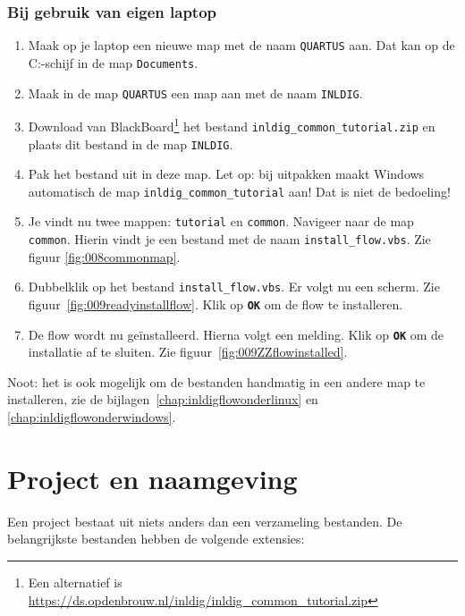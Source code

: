 \documentclass[a4paper,12pt,fleqn,twoside]{book}
\newcommand{\knop}[1]{\texttt{\textbf{#1}}}
\begin{document}
\subsubsection*{Bij gebruik van eigen laptop}
\begin{enumerate}\itemsep-1pt
\item Maak op je laptop een nieuwe map met de naam \lstinline{QUARTUS} aan. Dat kan op de C:-schijf in de map \lstinline|Documents|.
\item Maak in de map \lstinline|QUARTUS| een map aan met de naam \lstinline|INLDIG|.
\item Download van BlackBoard\footnote{Een alternatief is
      \url{https://ds.opdenbrouw.nl/inldig/inldig_common_tutorial.zip}} het
      bestand \lstinline|inldig_common_tutorial.zip| en plaats dit bestand in
      de map \lstinline|INLDIG|. 
\item Pak het bestand uit in deze map. Let op: bij uitpakken maakt Windows
      automatisch de map \lstinline|inldig_common_tutorial| aan! Dat is niet
      de bedoeling!
\item Je vindt nu twee mappen: \lstinline|tutorial| en \lstinline|common|.
      Navigeer naar de map \lstinline|common|. Hierin vindt je een bestand met
      de naam \lstinline|install_flow.vbs|. Zie figuur \ref{fig:008commonmap}.
\item Dubbelklik op het bestand \lstinline|install_flow.vbs|. Er volgt nu een scherm.
	  Zie figuur~\ref{fig:009readyinstallflow}. Klik op \knop{OK} om de flow te installeren.
\item De flow wordt nu ge\"installeerd. Hierna volgt een melding. Klik op \knop{OK} om de installatie af te sluiten.
Zie figuur~\ref{fig:009ZZflowinstalled}.
\end{enumerate}
 
Noot: het is ook mogelijk om de bestanden handmatig in een andere map te
installeren, zie de bijlagen~\ref{chap:inldigflowonderlinux} en
\ref{chap:inldigflowonderwindows}. 


\section{Project en naamgeving}
\label{sec:projectennaamgeving}
Een project bestaat uit niets anders dan een verzameling bestanden. De
belangrijkste bestanden hebben de volgende extensies: 
\end{document}
